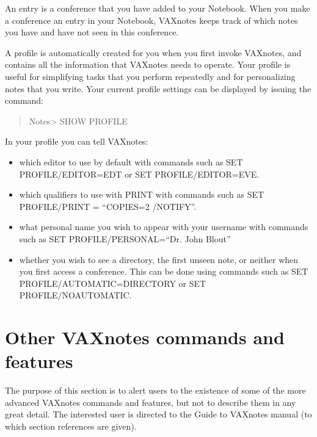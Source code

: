 An entry is a conference that you have added to your Notebook. When you
make a conference an entry in your Notebook, VAXnotes keeps track
of which notes you have and have not seen in this conference.

A profile is automatically created for you when you first invoke VAXnotes,
and contains all the information that VAXnotes needs to operate. Your profile
is useful for simplifying tasks that you perform repeatedly and for
personalizing notes that you write. Your current profile settings
can be displayed by issuing the command:

\begin{quote}\tt

Notes> SHOW PROFILE

\end{quote}

In your profile you can tell VAXnotes:

\begin{itemize}

\item which editor to use by default with commands such as
SET PROFILE/EDITOR=EDT or SET PROFILE/EDITOR=EVE.

\item which qualifiers to use with PRINT with commands such as
SET PROFILE/PRINT = ``COPIES=2 /NOTIFY''.

\item what personal name you wish to appear with your username
with commands such as SET PROFILE/PERSONAL=``Dr. John Blout''

\item whether you wish to see a directory, the first unseen note,
or neither when you first access a conference. This can be done
using commands such as SET PROFILE/AUTOMATIC=DIRECTORY or
SET PROFILE/NOAUTOMATIC.

\end{itemize}

\section {Other VAXnotes commands and features}

The purpose of this section is to alert users to the existence
of some of the more advanced
VAXnotes commands and features, but not to describe them in any great
detail. The interested user is directed to the Guide to VAXnotes manual (to
which section references are given).

